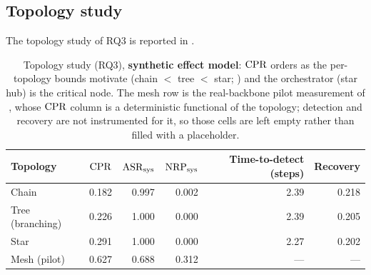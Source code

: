 \subsection{Topology study}
\label{app:topology-table}
The topology study of RQ3 is reported in .
\begin{table}[t]
\centering
\caption{Topology study (RQ3), \textbf{synthetic effect model}: $\mathrm{CPR}$ orders as the
per-topology bounds motivate (chain $<$ tree $<$ star; )
and the orchestrator (star hub) is the critical node. The mesh row is the real-backbone pilot
measurement of , whose $\mathrm{CPR}$ column is a deterministic
functional of the topology; detection and recovery are not instrumented for it, so those
cells are left empty rather than filled with a placeholder.}
\label{tab:topology}
\small
\renewcommand{\arraystretch}{1.08}
\setlength{\tabcolsep}{4pt}
\begin{tabular}{@{}lrrrrr@{}}
\toprule
Topology & $\mathrm{CPR}$ & $\mathrm{ASR}_{\mathrm{sys}}$ & $\mathrm{NRP}_{\mathrm{sys}}$ & Time-to-detect (steps) & Recovery \\
\midrule
Chain            & 0.182 & 0.997 & 0.002 & 2.39 & 0.218 \\
Tree (branching) & 0.226 & 1.000 & 0.000 & 2.39 & 0.205 \\
Star             & 0.291 & 1.000 & 0.000 & 2.27 & 0.202 \\
Mesh (pilot)     & 0.627 & 0.688 & 0.312 & ---   & ---   \\
\bottomrule
\end{tabular}
\end{table}

